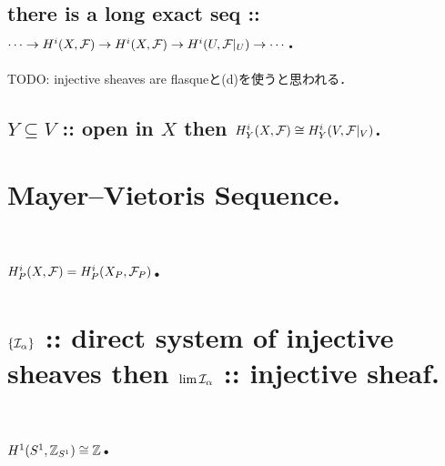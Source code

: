 \documentclass[a4paper]{jsarticle}
\begin{document}
    \subsection{there is a long exact seq ::
        $\cdots \to H^i(X,\mathcal{F}) \to H^i(X, \mathcal{F}) \to H^i(U, \mathcal{F}|_U) \to \cdots$. }
    TODO: injective sheaves are flasqueと(d)を使うと思われる．

    \subsection{$Y \subseteq V$ :: open in $X$ then $H^i_Y(X, \mathcal{F}) \cong H^i_Y(V, \mathcal{F}|_V)$.}

\section{Mayer--Vietoris Sequence.} %

\section{$H^i_P(X, \mathcal{F})=H^i_P(X_P, \mathcal{F}_P)$.} %

\section{$\{\mathcal{I}_{\alpha} \}$ :: direct system of injective sheaves
    then $\lim \mathcal{I}_{\alpha}$ :: injective sheaf.} %

\section{$H^1(S^1, \mathbb{Z}_{S^1}) \cong \mathbb{Z}$.} %
\end{document}
